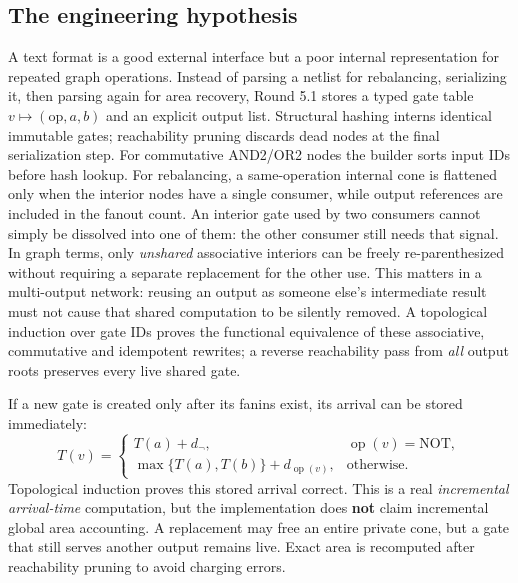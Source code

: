 \subsection{The engineering hypothesis}
A text format is a good external interface but a poor internal representation for repeated graph operations. Instead of parsing a netlist for rebalancing, serializing it, then parsing again for area recovery, Round 5.1 stores a typed gate table $v\mapsto(\mathrm{op},a,b)$ and an explicit output list. Structural hashing interns identical immutable gates; reachability pruning discards dead nodes at the final serialization step. For commutative AND2/OR2 nodes the builder sorts input IDs before hash lookup. For rebalancing, a same-operation internal cone is flattened only when the interior nodes have a single consumer, while output references are included in the fanout count. An interior gate used by two consumers cannot simply be dissolved into one of them: the other consumer still needs that signal. In graph terms, only \emph{unshared} associative interiors can be freely re-parenthesized without requiring a separate replacement for the other use. This matters in a multi-output network: reusing an output as someone else's intermediate result must not cause that shared computation to be silently removed. A topological induction over gate IDs proves the functional equivalence of these associative, commutative and idempotent rewrites; a reverse reachability pass from \emph{all} output roots preserves every live shared gate.

If a new gate is created only after its fanins exist, its arrival can be stored immediately:
\begin{equation}
 T(v)=\begin{cases}
 T(a)+d_{\neg},&\operatorname{op}(v)=\mathrm{NOT},\\
 \max\{T(a),T(b)\}+d_{\operatorname{op}(v)},&\text{otherwise}.
 \end{cases}
\end{equation}
Topological induction proves this stored arrival correct. This is a real \emph{incremental arrival-time} computation, but the implementation does \textbf{not} claim incremental global area accounting. A replacement may free an entire private cone, but a gate that still serves another output remains live. Exact area is recomputed after reachability pruning to avoid charging errors.

